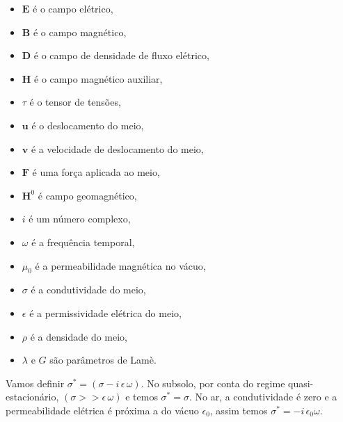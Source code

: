 \begin{itemize}
\item $\mathbf{{E}}$ \'e o campo el\'etrico,
\item $\mathbf{{B}}$ \'e o campo magn\'etico,
\item $\mathbf{{D}}$ \'e o campo de densidade de fluxo el\'etrico,
\item $\mathbf{{H}}$ \'e o campo magn\'etico auxiliar,
\item $\tau$ \'e o tensor de tens\~oes,
\item $\mathbf{{u}}$ \'e o deslocamento do meio,
\item $\mathbf{{v}}$ \'e a velocidade de deslocamento do meio,
\item $\mathbf{{F}}$ \'e uma for\c{c}a aplicada ao meio,
\item $\mathbf{H}^0$ \'e campo geomagn\'etico,
\item $i$ \'e um n\'umero complexo,
\item $\omega$ \'e a frequ\^encia temporal,
\item $\mu_0$ \'e a permeabilidade magn\'etica no v\'acuo,
\item $\sigma$ \'e a condutividade do meio,
\item $\epsilon$ \'e a permissividade el\'etrica do meio,
\item $\rho$ \'e a densidade do meio,
\item $\lambda$ e $G$ s\~ao par\^ametros de Lam\`e.
\end{itemize}
Vamos definir $\sigma^*=(\sigma-i\,\epsilon\,\omega)$. No subsolo, por conta do regime quasi-estacion\'ario, $(\sigma>>\epsilon\,\omega)$  e  temos $\sigma^*=\sigma$. No ar, a condutividade \'e zero e a permeabilidade el\'etrica \'e pr\'oxima a do v\'acuo $\epsilon_0$, assim temos $\sigma^*=-i\,\epsilon_0\omega$.

